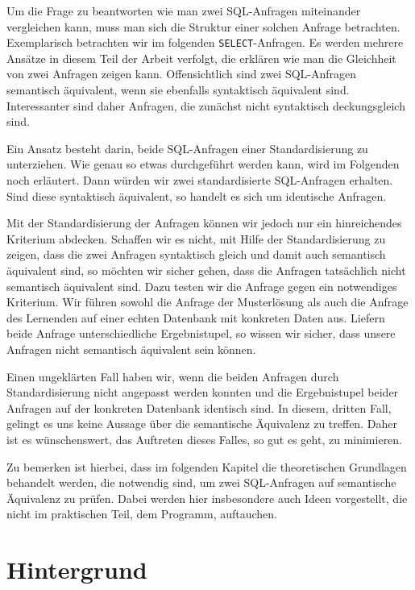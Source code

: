 Um die Frage zu beantworten wie man zwei SQL-Anfragen miteinander vergleichen kann, muss man sich die Struktur einer solchen Anfrage betrachten. Exemplarisch betrachten wir im folgenden \verb|SELECT|-Anfragen. Es werden mehrere Ansätze in diesem Teil der Arbeit verfolgt, die erklären wie man die Gleichheit von zwei Anfragen zeigen kann. Offensichtlich sind zwei SQL-Anfragen semantisch äquivalent, wenn sie ebenfalls syntaktisch äquivalent sind. Interessanter sind daher Anfragen, die zunächst nicht syntaktisch deckungsgleich sind. 

Ein Ansatz besteht darin, beide SQL-Anfragen einer Standardisierung zu unterziehen. Wie genau so etwas durchgeführt werden kann, wird im Folgenden noch erläutert. Dann würden wir zwei standardisierte SQL-Anfragen erhalten. Sind diese syntaktisch äquivalent, so handelt es sich um identische Anfragen. 

Mit der Standardisierung der Anfragen können wir jedoch nur ein hinreichendes Kriterium abdecken. Schaffen wir es nicht, mit Hilfe der Standardisierung zu zeigen, dass die zwei Anfragen syntaktisch gleich und damit auch semantisch äquivalent sind, so möchten wir sicher gehen, dass die Anfragen tatsächlich nicht semantisch äquivalent sind. Dazu testen wir die Anfrage gegen ein notwendiges Kriterium. Wir führen sowohl die Anfrage der Musterlösung als auch die Anfrage des Lernenden auf einer echten Datenbank mit konkreten Daten aus. Liefern beide Anfrage unterschiedliche Ergebnistupel, so wissen wir sicher, dass unsere Anfragen nicht semantisch äquivalent sein können. 

Einen ungeklärten Fall haben wir, wenn die beiden Anfragen durch Standardisierung nicht angepasst werden konnten und die Ergebnistupel beider Anfragen auf der konkreten Datenbank identisch sind. In diesem, dritten Fall, gelingt es uns keine Aussage über die semantische Äquivalenz zu treffen. Daher ist es wünschenswert, das Auftreten dieses Falles, so gut es geht, zu minimieren.

Zu bemerken ist hierbei, dass im folgenden Kapitel die theoretischen Grundlagen behandelt werden, die notwendig sind, um zwei SQL-Anfragen auf semantische Äquivalenz zu prüfen. Dabei werden hier insbesondere auch Ideen vorgestellt, die nicht im praktischen Teil, dem Programm, auftauchen. 

\section{Hintergrund}

